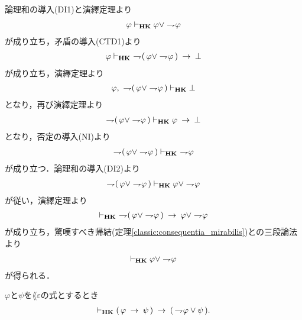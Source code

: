 	\begin{sketch}
		論理和の導入(DI1)と演繹定理より
		\begin{align}
			\varphi \vdash_{{\scriptsize \mbox{{\bf HK}}}} \varphi \vee \rightharpoondown\hspace{-0.25em} \varphi
		\end{align}
		が成り立ち，矛盾の導入(CTD1)より
		\begin{align}
			\varphi \provable{\mbox{{\bf HK}}}\ 
			\negation (\, \varphi \vee \negation \varphi\, ) \rarrow \bot
		\end{align}
		が成り立ち，演繹定理より
		\begin{align}
			\varphi,\ \rightharpoondown\hspace{-0.25em} (\, \varphi \vee \rightharpoondown\hspace{-0.25em} \varphi\, )
			\vdash_{{\scriptsize \mbox{{\bf HK}}}} \bot
		\end{align}
		となり，再び演繹定理より
		\begin{align}
			\rightharpoondown\hspace{-0.25em} (\, \varphi \vee \rightharpoondown\hspace{-0.25em} \varphi\, )
			\vdash_{{\scriptsize \mbox{{\bf HK}}}} \varphi \hspace{0.25em}\rightarrow\hspace{0.25em} \bot
		\end{align}
		となり，否定の導入(NI)より
		\begin{align}
			\rightharpoondown\hspace{-0.25em} (\, \varphi \vee \rightharpoondown\hspace{-0.25em} \varphi\, )
			\vdash_{{\scriptsize \mbox{{\bf HK}}}}\ \rightharpoondown\hspace{-0.25em} \varphi
		\end{align}
		が成り立つ．論理和の導入(DI2)より
		\begin{align}
			\rightharpoondown\hspace{-0.25em} (\, \varphi \vee \rightharpoondown\hspace{-0.25em} \varphi\, )
			\vdash_{{\scriptsize \mbox{{\bf HK}}}} \varphi \vee \rightharpoondown\hspace{-0.25em} \varphi
		\end{align}
		が従い，演繹定理より
		\begin{align}
			\provable{\mbox{{\bf HK}}}\ 
			\negation (\, \varphi \vee \negation \varphi\, )
			\rarrow \varphi \vee \negation \varphi
		\end{align}
		が成り立ち，驚嘆すべき帰結(定理\ref{classic:consequentia_mirabilis})との三段論法より
		\begin{align}
			\vdash_{{\scriptsize \mbox{{\bf HK}}}} \varphi \vee \rightharpoondown\hspace{-0.25em} \varphi
		\end{align}
		が得られる．
		\QED
	\end{sketch}
	
	\begin{screen}
		\begin{thm}[含意は否定と論理和で表せる]
		\label{classic:implication_rewritable_by_disjunction_of_negation}
			$\varphi$と$\psi$を$\lang{\varepsilon}$の式とするとき
			\begin{align}
				\vdash_{{\scriptsize \mbox{{\bf HK}}}} (\, \varphi \hspace{0.25em}\rightarrow\hspace{0.25em} \psi\, )
				\hspace{0.25em}\rightarrow\hspace{0.25em} (\, \rightharpoondown\hspace{-0.25em} \varphi \vee \psi\, ).
			\end{align}
		\end{thm}
	\end{screen}
	

